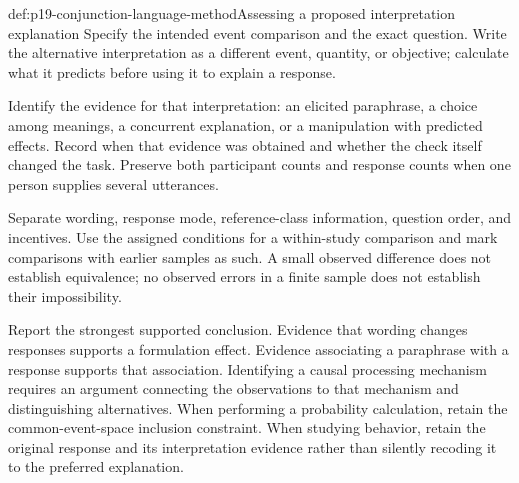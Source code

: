 \begin{hbmethod}{def:p19-conjunction-language-method}{Assessing a proposed interpretation explanation}
Specify the intended event comparison and the exact question.
Write the alternative interpretation as a different event,
quantity, or objective; calculate what it predicts before
using it to explain a response.

Identify the evidence for that interpretation: an elicited
paraphrase, a choice among meanings, a concurrent explanation,
or a manipulation with predicted effects. Record when that
evidence was obtained and whether the check itself changed
the task. Preserve both participant counts and response
counts when one person supplies several utterances.

Separate wording, response mode, reference-class information,
question order, and incentives. Use the assigned conditions
for a within-study comparison and mark comparisons with
earlier samples as such. A small observed difference does
not establish equivalence; no observed errors in a finite
sample does not establish their impossibility.

Report the strongest supported conclusion. Evidence that
wording changes responses supports a formulation effect.
Evidence associating a paraphrase with a response supports
that association. Identifying a causal processing mechanism
requires an argument connecting the observations to that
mechanism and distinguishing alternatives.
When performing a probability calculation, retain the
common-event-space inclusion constraint. When studying
behavior, retain the original response and its interpretation
evidence rather than silently recoding it to the preferred
explanation.
\end{hbmethod}
